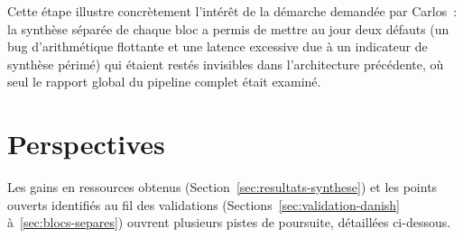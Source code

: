 \documentclass[11pt,a4paper]{article}
\begin{document}
Cette étape illustre concrètement l'intérêt de la démarche demandée par Carlos~: la synthèse séparée de chaque bloc a permis de mettre au jour deux défauts (un bug d'arithmétique flottante et une latence excessive due à un indicateur de synthèse périmé) qui étaient restés invisibles dans l'architecture précédente, où seul le rapport global du pipeline complet était examiné.


\section{Perspectives}
\label{sec:perspectives}

Les gains en ressources obtenus (Section~\ref{sec:resultats-synthese}) et les points ouverts identifiés au fil des validations (Sections~\ref{sec:validation-danish} à~\ref{sec:blocs-separes}) ouvrent plusieurs pistes de poursuite, détaillées ci-dessous.
\end{document}
